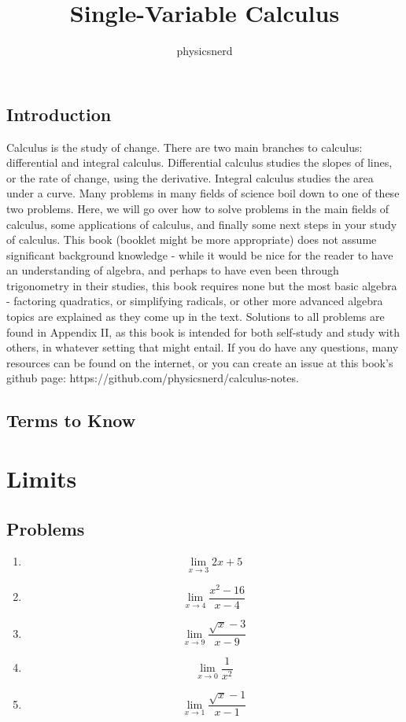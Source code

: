 \documentclass{book}
\title{Single-Variable Calculus}
\author{physicsnerd}
\begin{document}
\maketitle
\tableofcontents
\mainmatter
\chapter{Introduction}
Calculus is the study of change. 
There are two main branches to calculus: differential and integral calculus. 
Differential calculus studies the slopes of lines, or the rate of change, using the derivative. 
Integral calculus studies the area under a curve. 
Many problems in many fields of science boil down to one of these two problems. 
Here, we will go over how to solve problems in the main fields of calculus, some applications of calculus, and finally some next steps in your study of calculus.
This book (booklet might be more appropriate) does not assume significant background knowledge - while it would be nice for the reader to have an understanding of algebra, and perhaps to have even been through trigonometry in their studies, this book requires none but the most basic algebra - factoring quadratics, or simplifying radicals, or other more advanced algebra topics are explained as they come up in the text. 
Solutions to all problems are found in Appendix II, as this book is intended for both self-study and study with others, in whatever setting that might entail.
If you do have any questions, many resources can be found on the internet, or you can create an issue at this book's github page: https://github.com/physicsnerd/calculus-notes.

\chapter{Terms to Know}



\part{Limits}



\chapter{Problems}
\begin{enumerate}
    \item $$\lim\limits_{x\rightarrow 3} 2x+5$$
    \item $$\lim\limits_{x\rightarrow 4} \frac{x^2-16}{x-4}$$
    \item $$\lim\limits_{x\rightarrow 9} \frac{\sqrt{x}-3}{x-9}$$
    \item $$\lim\limits_{x\rightarrow 0} \frac{1}{x^2}$$
    \item $$\lim\limits_{x\rightarrow 1} \frac{\sqrt{x}-1}{x-1}$$
\end{enumerate}
\end{document}
